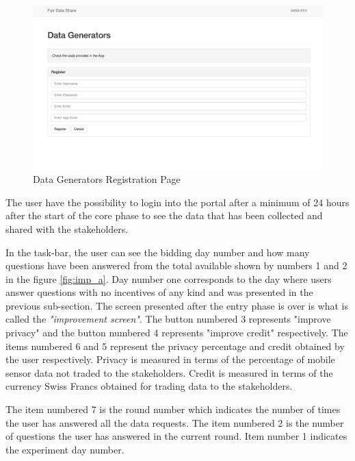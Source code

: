 \begin{figure}[ht!]
\centering
\includegraphics[width=\textwidth,keepaspectratio]{./images/fds_user_register}
\caption{Data Generators Registration Page}
\label{fig:first}
\end{figure}

The user have the possibility to login into the portal after a minimum of 24 hours after the start of the core phase to see the data that has been collected and shared with the stakeholders. 

In the task-bar, the user can see the bidding day number and how many questions have been answered from the total available shown by numbers 1 and 2 in the figure \ref{fig:imp_a}. Day number one
corresponds to the day where users answer questions with no incentives of any kind and was presented in the previous sub-section. The screen presented after the entry phase is over is what is called the \textit{"improvement screen"}. 
The button numbered 3
represents "improve privacy" and the button numbered 4 represents "improve credit" respectively. The items numbered 6 and 5 represent the privacy percentage and credit obtained by the user respectively. Privacy is measured in terms of the percentage of mobile sensor data not traded to the stakeholders. Credit is measured in terms of the currency Swiss Francs obtained for trading data to the stakeholders. 

The item numbered 7 is the round number which indicates the number of times the user has answered all the data requests. The item numbered 2 is the number of questions the user has answered in the current round. Item number 1 indicates the experiment day number.



